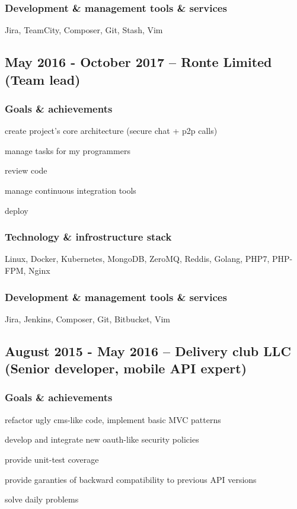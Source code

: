 \documentclass[9pt, a4paper, english]{extarticle}
\begin{document}
    \subsubsection* {Development \& management tools \& services}
      Jira, TeamCity, Composer, Git, Stash, Vim


  \subsection* {May 2016 - October 2017 -- \textbf{Ronte Limited} (Team lead)}
    \subsubsection* {Goals \& achievements}
      \begin {list}{\textbullet}{\itemsep=0mm}
        \item create project's core architecture (secure chat + p2p calls)
        \item manage tasks for my programmers
        \item review code
        \item manage continuous integration tools
        \item deploy
      \end{list}
    \subsubsection* {Technology \& infrostructure stack}
      Linux, Docker, Kubernetes, MongoDB, ZeroMQ, Reddis, Golang, PHP7, PHP-FPM, Nginx
    \subsubsection* {Development \& management tools \& services}
      Jira, Jenkins, Composer, Git, Bitbucket, Vim


  \subsection* {August 2015 - May 2016 -- \textbf{Delivery club LLC} (Senior developer, mobile API expert)}
    \subsubsection* {Goals \& achievements}
      \begin {list}{\textbullet}{\itemsep=0mm}
        \item refactor ugly cms-like code, implement basic MVC patterns
        \item develop and integrate new oauth-like security policies
        \item provide unit-test coverage
        \item provide garanties of backward compatibility to previous API versions
        \item solve daily problems
      \end{list}
\end{document}
